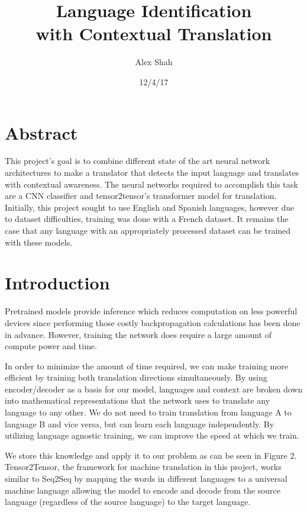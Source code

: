 \documentclass[10pt,a4paper]{article}
\begin{document}
\title{Language Identification \\ with Contextual Translation}
\author{Alex Shah}
\date{12/4/17}


\maketitle


\section{Abstract}


This project's goal is to combine different state of the art neural network architectures to make a translator that detects the input language and translates with contextual awareness. The neural networks required to accomplish this task are a CNN classifier and tensor2tensor's transformer model for translation. Initially, this project sought to use English and Spanish languages, however due to dataset difficulties, training was done with a French dataset. It remains the case that any language with an appropriately processed dataset can be trained with these models.


\section{Introduction}


Pretrained models provide inference which reduces computation on less powerful devices since performing those costly backpropagation calculations has been done in advance. However, training the network does require a large amount of compute power and time.


In order to minimize the amount of time required, we can make training more efficient by training both translation directions simultaneously. By using encoder/decoder as a basis for our model, languages and context are broken down into mathematical representations that the network uses to translate any language to any other. We do not need to train translation from language A to language B and vice versa, but can learn each language independently. By utilizing language agnostic training, we can improve the speed at which we train. 


We store this knowledge and apply it to our problem as can be seen in Figure 2. Tensor2Tensor, the framework for machine translation in this project, works similar to Seq2Seq by mapping the words in different languages to a universal machine language allowing the model to encode and decode from the source language (regardless of the source language) to the target language.
\end{document}
